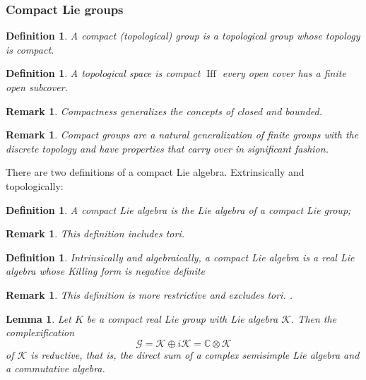 \documentclass[aps,preprint]{revtex4}%
\newtheorem{definition}[theorem]{Definition}
\newtheorem{lemma}[theorem]{Lemma}
\newtheorem{remark}[theorem]{Remark}
\begin{document}
\subsubsection{Compact Lie groups}

\begin{definition}
A compact (topological) group is a topological group whose topology is compact.
\end{definition}

\begin{definition}
A topological space is \emph{compact} $\operatorname*{Iff}$ every open cover
has a finite open subcover.
\end{definition}

\begin{remark}
Compactness generalizes the concepts of closed and bounded.
\end{remark}

\begin{remark}
Compact groups are a natural generalization of finite groups with the discrete
topology and have properties that carry over in significant fashion.
\end{remark}

There are two definitions of a compact Lie algebra. Extrinsically and topologically:

\begin{definition}
A compact Lie algebra is the Lie algebra of a compact Lie group;
\end{definition}

\begin{remark}
This definition includes tori.
\end{remark}

\begin{definition}
Intrinsically and algebraically, a compact Lie algebra is a real Lie algebra
whose Killing form is negative definite
\end{definition}

\begin{remark}
This definition is more restrictive and excludes tori. .
\end{remark}

\begin{lemma}
Let $K$ be a \emph{compact real }Lie group with Lie algebra $\mathcal{K}$.
Then the complexification
\begin{equation}
\mathcal{G}=\mathcal{K}\oplus i\mathcal{K}=\mathbb{C\otimes}\mathcal{K}%
\end{equation}
of $\mathcal{K}$ is\emph{ reductive}, that is, \emph{the direct sum }of a
complex semisimple Lie algebra and a commutative algebra.
\end{lemma}
\end{document}
